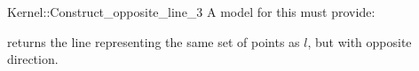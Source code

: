 \begin{ccRefFunctionObjectConcept}{Kernel::Construct_opposite_line_3}
A model for this must provide:


{returns the line representing the same set of points as $l$,
but with opposite direction.}

\end{ccRefFunctionObjectConcept}
